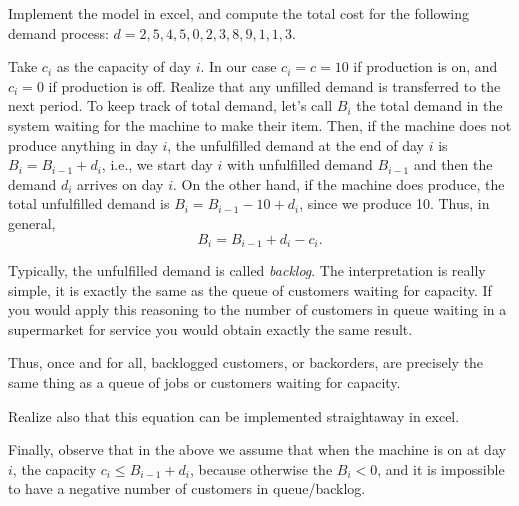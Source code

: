 \begin{question}
  Implement the model in excel, and compute the total cost for the
  following demand process: $d = 2, 5, 4, 5, 0, 2, 3, 8, 9, 1, 1, 3$.
\begin{solution}
  Take $c_i$ as the capacity of day $i$. In our case $c_i=c=10$ if
  production is on, and $c_i=0$ if production is off.  Realize that
  any unfilled demand is transferred to the next period. To keep track
  of total demand, let's call $B_i$ the total demand in the system
  waiting for the machine to make their item. Then, if the machine
  does not produce anything in day $i$, the unfulfilled demand at the
  end of day $i$ is $B_i=B_{i-1}+d_i$, i.e., we start day $i$ with
  unfulfilled demand $B_{i-1}$ and then the demand $d_i$ arrives on
  day $i$. On the other hand, if the machine does produce, the total
  unfulfilled demand is $B_i = B_{i-1}-10 + d_i$, since we produce
  10. Thus, in general,
  \begin{equation*}
    B_i = B_{i-1} + d_i - c_i.
  \end{equation*}


  Typically, the unfulfilled demand is called \emph{backlog}. The
  interpretation is really simple, it is exactly the same as the queue
  of customers waiting for capacity. If you would apply this reasoning
  to the number of customers in queue waiting in a supermarket for
  service you would obtain exactly the same result.  

Thus, once and for all, backlogged customers, or backorders, are precisely the same thing as a queue of jobs or customers waiting for capacity. 

Realize also that this equation can be implemented straightaway in
excel.

Finally, observe that in the above we assume that when the machine is
on at day $i$, the capacity $c_i \leq B_{i-1}+d_i$, because otherwise
the $B_i<0$, and it is impossible to have a negative number of
customers in queue/backlog.
\end{solution}
\end{question}


